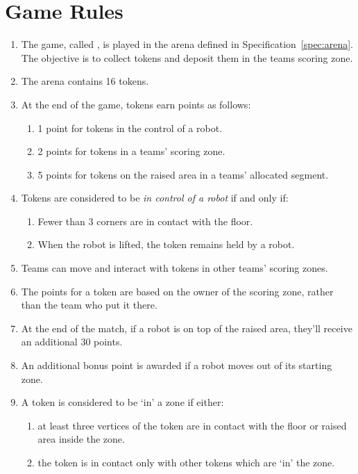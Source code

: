 \section{Game Rules}
\label{sec:rules}

\begin{enumerate}
  \item The game, called \emph{\gamename}, is played in the arena defined in
        Specification~\ref{spec:arena}. The objective is to collect tokens and
        deposit them in the teams scoring zone.
  \item The arena contains 16 tokens.
  \item At the end of the game, tokens earn points as follows:
    \begin{enumerate}
      \item 1 point for tokens in the control of a robot.
      \item 2 points for tokens in a teams' scoring zone.
      \item 5 points for tokens on the raised area in a teams' allocated segment.
    \end{enumerate}
  \item Tokens are considered to be \textit{in control of a robot} if and only if:
    \begin{enumerate}
      \item Fewer than 3 corners are in contact with the floor.
      \item When the robot is lifted, the token remains held by a robot.
    \end{enumerate}
  \item Teams can move and interact with tokens in other teams' scoring zones.
  \item The points for a token are based on the owner of the scoring zone, rather than
        the team who put it there.
  \item At the end of the match, if a robot is on top of the raised area, they'll
        receive an additional 30 points.
  \item An additional bonus point is awarded if a robot moves out of its starting
        zone.
  \item A token is considered to be `in' a zone if either:
    \begin{enumerate}
      \item at least three vertices of the token are in contact with the floor or
            raised area inside the zone.
      \item the token is in contact only with other tokens which are `in' the zone.

\end{enumerate}
\end{enumerate}
